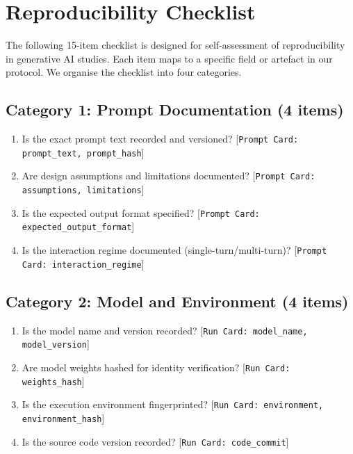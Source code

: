 \documentclass[11pt]{article}
\begin{document}
\section{Reproducibility Checklist}
\label{sec:s8}

The following 15-item checklist is designed for self-assessment of reproducibility in generative AI studies. Each item maps to a specific field or artefact in our protocol. We organise the checklist into four categories.

\subsection*{Category 1: Prompt Documentation (4 items)}
\begin{enumerate}
    \item Is the exact prompt text recorded and versioned?
    \hfill [\texttt{Prompt Card: prompt\_text, prompt\_hash}]
    \item Are design assumptions and limitations documented?
    \hfill [\texttt{Prompt Card: assumptions, limitations}]
    \item Is the expected output format specified?
    \hfill [\texttt{Prompt Card: expected\_output\_format}]
    \item Is the interaction regime documented (single-turn/multi-turn)?
    \hfill [\texttt{Prompt Card: interaction\_regime}]
\end{enumerate}

\subsection*{Category 2: Model and Environment (4 items)}
\begin{enumerate}[resume]
    \item Is the model name and version recorded?
    \hfill [\texttt{Run Card: model\_name, model\_version}]
    \item Are model weights hashed for identity verification?
    \hfill [\texttt{Run Card: weights\_hash}]
    \item Is the execution environment fingerprinted?
    \hfill [\texttt{Run Card: environment, environment\_hash}]
    \item Is the source code version recorded?
    \hfill [\texttt{Run Card: code\_commit}]
\end{enumerate}
\end{document}
